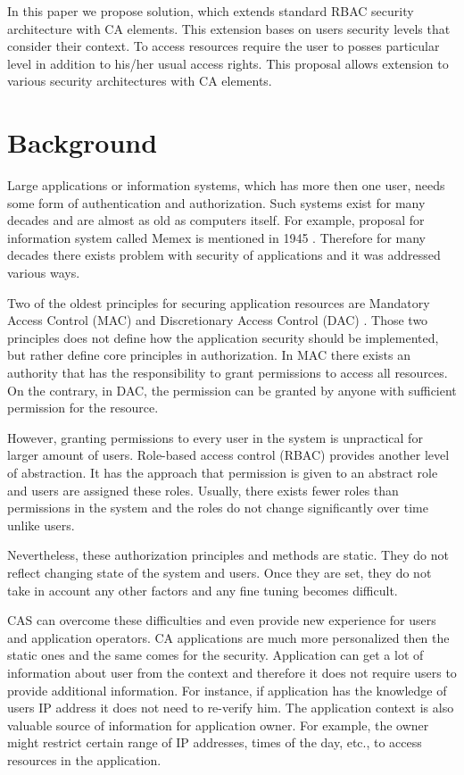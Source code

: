 \documentclass{poster15}
\begin{document}
In this paper we propose solution, which extends standard RBAC security architecture with CA elements. This extension bases on users security levels that consider their context. To access resources require the user to posses particular level in addition to his/her usual access rights. This proposal allows extension to various security architectures with CA elements.

\section{Background}

Large applications or information systems, which has more then one user, needs some form of authentication and authorization. Such systems exist for many decades and are almost as old as computers itself. For example, proposal for information system called Memex is mentioned in 1945 \cite{memex}. Therefore for many decades there exists problem with security of applications and it was addressed various ways.

Two of the oldest principles for securing application resources are Mandatory Access Control (MAC) \cite{accesscontrol} and Discretionary Access Control (DAC) \cite{accesscontrol}. Those two principles does not define how the application security should be implemented, but rather define core principles in authorization. In MAC there exists an authority that has the responsibility to grant permissions to access all resources. On the contrary, in DAC, the permission can be granted by anyone with sufficient permission for the resource.

However, granting permissions to every user in the system is unpractical for larger amount of users. Role-based access control (RBAC) \cite{rbac} provides another level of abstraction. It has the approach that permission is given to an abstract role and users are assigned these roles. Usually, there exists fewer roles than permissions in the system and the roles do not change significantly over time unlike users.

Nevertheless, these authorization principles and methods are static. They do not reflect changing state of the system and users. Once they are set, they do not take in account any other factors and any fine tuning becomes difficult.

CAS can overcome these difficulties and even provide new experience for users and application operators. CA applications are much more personalized then the static ones and the same comes for the security. Application can get a lot of information about user from the context and therefore it does not require users to provide additional information. For instance, if application has the knowledge of users IP address it does not need to re-verify him. The application context is also valuable source of information for application owner. For example, the owner might restrict certain range of IP addresses, times of the day, etc., to access resources in the application. 
\end{document}
